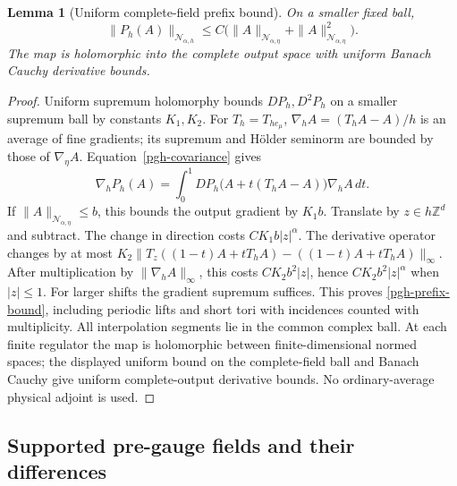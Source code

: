 \documentclass[11pt]{article}
\newtheorem{lemma}[theorem]{Lemma}
\theoremstyle{remark}
\begin{document}
\begin{lemma}[Uniform complete-field prefix bound]
\label{pgh-prefix-lemma}
On a smaller fixed ball,
\begin{equation}
 \|P_h(A)\|_{\mathcal N_{\alpha,h}}
 \le C\bigl(\|A\|_{\mathcal N_{\alpha,\eta}}
                   +\|A\|_{\mathcal N_{\alpha,\eta}}^2\bigr).
 \label{pgh-prefix-bound}
\end{equation}
The map is holomorphic into the complete output space with uniform
Banach Cauchy derivative bounds.
\end{lemma}
\begin{proof}
Uniform supremum holomorphy bounds $DP_h,D^2P_h$ on a smaller
supremum ball by constants $K_1,K_2$. For $T_h=T_{he_\mu}$,
$\nabla_hA=(T_hA-A)/h$ is an average of fine gradients; its
supremum and H\"older seminorm are bounded by those of
$\nabla_\eta A$. Equation~\eqref{pgh-covariance} gives
\begin{equation}
 \nabla_hP_h(A)=\int_0^1
 DP_h\bigl(A+t(T_hA-A)\bigr)\nabla_hA\,dt.
 \label{pgh-gradient-identity}
\end{equation}
If $\|A\|_{\mathcal N_{\alpha,\eta}}\le b$, this bounds the output
gradient by $K_1b$. Translate by $z\in h\mathbb Z^d$ and subtract.
The change in direction costs $CK_1b|z|^\alpha$. The derivative
operator changes by at most
$K_2\|T_z((1-t)A+tT_hA)-((1-t)A+tT_hA)\|_\infty$.
After multiplication by $\|\nabla_hA\|_\infty$, this costs
$CK_2b^2|z|$, hence $CK_2b^2|z|^\alpha$ when $|z|\le1$.
For larger shifts the gradient supremum suffices. This proves
\eqref{pgh-prefix-bound}, including periodic lifts and short tori
with incidences counted with multiplicity. All interpolation
segments lie in the common complex ball. At each finite regulator
the map is holomorphic between finite-dimensional normed spaces;
the displayed uniform bound on the complete-field ball and
Banach Cauchy give uniform complete-output derivative bounds.
No ordinary-average physical adjoint is used.
\end{proof}

\subsection{Supported pre-gauge fields and their differences}
\label{pgh-support-section}
\end{document}
